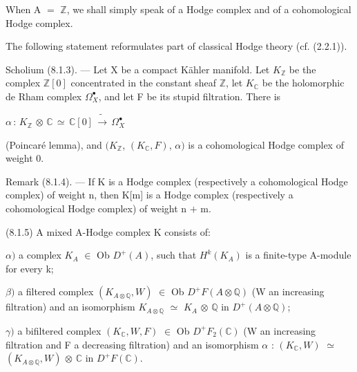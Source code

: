 \documentclass[11pt,twoside]{article}
\newcommand{\DFormula}[1]{%
  \par\smallskip\noindent\hspace*{0pt}\(\displaystyle #1\)\par\smallskip
}
\begin{document}
When A \(=\) \(\mathbb{Z}\), we shall simply speak of a Hodge complex and of a cohomological Hodge complex.\par
\par\medskip
The following statement reformulates part of classical Hodge theory (cf. (2.2.1)).\par
\par\medskip
Scholium (8.1.3). — Let X be a compact Kähler manifold. Let \(K_{\mathbb{Z}}\) be the complex \(\mathbb{Z}[0]\) concentrated in the constant sheaf \(\mathbb{Z}\), let \(K_{\mathbb{C}}\) be the holomorphic de Rham complex \(\Omega _{X}^{\bullet }\), and let F be its stupid filtration. There is\par
\par\medskip
\DFormula{\alpha \,:\,K_{\mathbb{Z}}\,\otimes \,\mathbb{C}\,\simeq \,\mathbb{C}[0]\,\widetilde{\to }\,\Omega _{X}^{\bullet }}
\par\medskip
(Poincaré lemma), and \((K_{\mathbb{Z}}\), \((K_{\mathbb{C}},F)\), \(\alpha )\) is a cohomological Hodge complex of weight 0.\par
\par\medskip
Remark (8.1.4). — If K is a Hodge complex (respectively a cohomological Hodge complex) of weight n, then K[m] is a Hodge complex (respectively a cohomological Hodge complex) of weight n \(+\) m.\par
\par\medskip
(8.1.5) A mixed A-Hodge complex K consists of:\par
\par\medskip
\(\alpha )\) a complex \(K_{A}\) \(\in \) Ob \(D^{+}(A)\), such that \(H^{k}(K_{A})\) is a finite-type A-module for every k;\par
\par\medskip
\(\beta )\) a filtered complex \((K_{A\otimes \mathbb{Q}},W)\) \(\in \) Ob \(D^{+}F(A\otimes \mathbb{Q})\) (W an increasing filtration) and an isomorphism \(K_{A\otimes \mathbb{Q}}\) \(\simeq \) \(K_{A}\) \(\otimes \) \(\mathbb{Q}\) in \(D^{+}(A\otimes \mathbb{Q})\);\par
\par\medskip
\(\gamma )\) a bifiltered complex \((K_{\mathbb{C}},W,F)\) \(\in \) Ob \(D^{+}F_{2}(\mathbb{C})\) (W an increasing filtration and F a decreasing filtration) and an isomorphism \(\alpha \) : \((K_{\mathbb{C}},W)\) \(\simeq \) \((K_{A\otimes \mathbb{Q}},W)\) \(\otimes \) \(\mathbb{C}\) in \(D^{+}F(\mathbb{C})\).\par
\par\medskip
\end{document}
